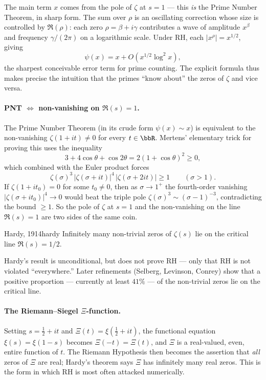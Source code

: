 The main term $x$ comes from the pole of $\zeta$ at $s=1$ --- this \emph{is} the Prime Number Theorem, in sharp form. The sum over $\rho$ is an oscillating correction whose size is controlled by $\Re(\rho)$: each zero $\rho=\beta+i\gamma$ contributes a wave of amplitude $x^{\beta}$ and frequency $\gamma/(2\pi)$ on a logarithmic scale. Under RH, each $|x^{\rho}|=x^{1/2}$, giving
$$\psi(x)=x+O(x^{1/2}\log^2 x),$$
the sharpest conceivable error term for prime counting. The explicit formula thus makes precise the intuition that the primes ``know about'' the zeros of $\zeta$ and vice versa.

\paragraph{PNT \texorpdfstring{$\Leftrightarrow$}{<=>} non-vanishing on \texorpdfstring{$\Re(s)=1$}{Re(s)=1}.} The Prime Number Theorem (in its crude form $\psi(x)\sim x$) is equivalent to the non-vanishing $\zeta(1+it)\neq 0$ for every $t\in\bbR$. Mertens' elementary trick for proving this uses the inequality
$$3+4\cos\theta+\cos 2\theta=2(1+\cos\theta)^2\geq 0,$$
which combined with the Euler product forces
$$\zeta(\sigma)^3\,|\zeta(\sigma+it)|^4\,|\zeta(\sigma+2it)|\geq 1 \qquad (\sigma>1).$$
If $\zeta(1+it_0)=0$ for some $t_0\neq 0$, then as $\sigma\to 1^+$ the fourth-order vanishing $|\zeta(\sigma+it_0)|^4\to 0$ would beat the triple pole $\zeta(\sigma)^3\sim(\sigma-1)^{-3}$, contradicting the bound $\geq 1$. So the pole of $\zeta$ at $s=1$ and the non-vanishing on the line $\Re(s)=1$ are two sides of the same coin.

\begin{Theorem}{Hardy, 1914}{hardy}
  Infinitely many non-trivial zeros of $\zeta(s)$ lie on the critical line $\Re(s)=1/2$.
\end{Theorem}

Hardy's result is unconditional, but does not prove RH --- only that RH is not violated ``everywhere.'' Later refinements (Selberg, Levinson, Conrey) show that a positive proportion --- currently at least $41\%$ --- of the non-trivial zeros lie on the critical line.

\paragraph{The Riemann--Siegel \texorpdfstring{$\Xi$}{Xi}-function.} Setting $s=\tfrac{1}{2}+it$ and $\Xi(t)=\xi(\tfrac{1}{2}+it)$, the functional equation $\xi(s)=\xi(1-s)$ becomes $\Xi(-t)=\Xi(t)$, and $\Xi$ is a real-valued, even, entire function of $t$. The Riemann Hypothesis then becomes the assertion that \emph{all} zeros of $\Xi$ are real; Hardy's theorem says $\Xi$ has infinitely many real zeros. This is the form in which RH is most often attacked numerically.

